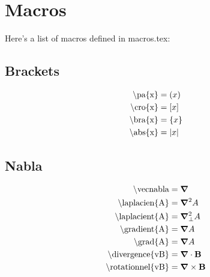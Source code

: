\section{Macros}

Here's a list of macros defined in macros.tex:

\subsection{Brackets}
\begin{subequations}
\begin{align}
\textrm{\textbackslash pa\{x\}}             & = \left( x \right)              \label{eqn:pa} \\
\textrm{\textbackslash cro\{x\}}            & = \left[ x \right]             \label{eqn:cro} \\
\textrm{\textbackslash bra\{x\}}            & = \left\{ x \right\}             \label{eqn:bra} \\
\textrm{\textbackslash abs\{x\}}            & = \left| x \right|             \label{eqn:abs}
\end{align}
\label{eqn:brackets}
\end{subequations}

\subsection{Nabla}
\begin{subequations}
\begin{align}
\textrm{\textbackslash vecnabla}            & = \bm{\nabla}           \label{eqn:vnabla}      \\
\textrm{\textbackslash laplacien\{A\}}      & = \bm{\nabla}^2 A       \label{eqn:laplacien}   \\
\textrm{\textbackslash laplacient\{A\}}     & = \bm{\nabla}_{\bot}^{2} A      \label{eqn:laplacient}  \\
\textrm{\textbackslash gradient\{A\}}       & = \bm{\nabla} A        \label{eqn:gradient}    \\
\textrm{\textbackslash grad\{A\}}           & = \bm{\nabla} A            \label{eqn:grad}        \\
\textrm{\textbackslash divergence\{vB\}}    & = \bm{\nabla} \cdot \textbf{B}    \label{eqn:divergence}  \\
\textrm{\textbackslash rotationnel\{vB\}}   & = \bm{\nabla} \times \textbf{B}   \label{eqn:rotationnel}
\end{align}
\end{subequations}



